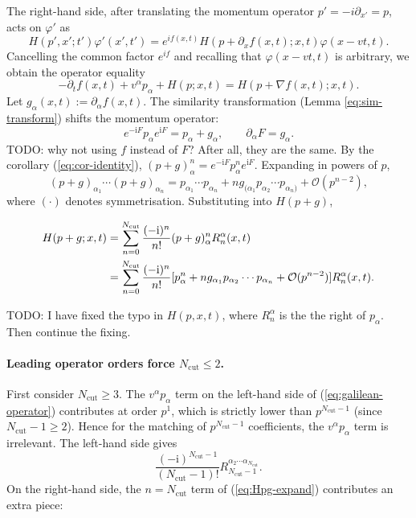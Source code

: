 \documentclass{book}
\newcommand{\assign}{:=}
\newcommand{\cdummy}{\cdot}
\newcommand{\mathi}{\mathrm{i}}
\newcommand{\tmop}[1]{\ensuremath{\operatorname{#1}}}
\begin{document}
The right-hand side, after translating the momentum operator $p' = - i
\partial_{x'} = p$, acts on $\varphi'$ as
\[ H (p', x' ; t') \varphi' (x', t') = e^{if (x, t)} H (p + \partial_x f (x,
   t) ; x, t) \varphi (x - vt, t) . \]
Cancelling the common factor $e^{if}$ and recalling that $\varphi (x - vt, t)$
is arbitrary, we obtain the operator equality
\begin{equation}
  - \partial_t f (x, t) + v^{\alpha} p_{\alpha} + H (p ; x, t) = H (p + \nabla
  f (x, t) ; x, t) . \label{eq:galilean-operator}
\end{equation}
Let $g_{\alpha}  (x, t) \assign \partial_{\alpha} f (x, t)$. The similarity
transformation (Lemma \ref{eq:sim-transform}) shifts the momentum operator:
\[ e^{- \mathi F} p_{\alpha} e^{\mathi F} = p_{\alpha} + g_{\alpha}, \qquad
   \partial_{\alpha} F = g_{\alpha} . \]
   TODO: why not using $f$ instead of $F$? After all, they are the same.
By the corollary (\ref{eq:cor-identity}), $(p + g)_{\alpha}^n = e^{- \mathi F}
p_{\alpha}^n e^{\mathi F}$. Expanding in powers of $p$,
\[ (p + g)_{\alpha_1} \cdots (p + g)_{\alpha_n} = p_{\alpha_1} \cdots
   p_{\alpha_n} + ng_{(\alpha_1} p_{\alpha_2} \cdots p_{\alpha_n)}
   +\mathcal{O} (p^{n - 2}), \]
where $(\cdummy)$ denotes symmetrisation. Substituting into $H (p + g)$,

\begin{align}
  H (p + g ; x, t) & = \sum_{n = 0}^{N_{\tmop{cut}}} \frac{(- \mathi)^n}{n!}
  (p + g)_{\alpha}^n {\color[HTML]{000000}R^{\alpha}_n  (x, t)} \nonumber\\
  & = \sum_{n = 0}^{N_{\tmop{cut}}} \frac{(- \mathi)^n}{n!}
  [p_{\alpha}^n + ng_{\alpha_1}
  p_{\alpha_2} \cdots p_{\alpha_n} +\mathcal{O}(p^{n - 2})] {\color[HTML]{000000}R^{\alpha}_n  (x, t)} . 
  \label{eq:Hpg-expand}
\end{align}

TODO: I have fixed the typo in $H(p,x,t)$, where $R_n^{\alpha}$ is the the right of $p_{\alpha}$. Then continue the fixing.

\paragraph{Leading operator orders force $N_{\tmop{cut}} \le 2$.} First
consider $N_{\tmop{cut}} \ge 3$. The $v^{\alpha} p_{\alpha}$ term on the
left-hand side of (\ref{eq:galilean-operator}) contributes at order $p^1$,
which is strictly lower than $p^{N_{\tmop{cut}} - 1}$ (since $N_{\tmop{cut}} -
1 \ge 2$). Hence for the matching of $p^{N_{\tmop{cut}} - 1}$ coefficients,
the $v^{\alpha} p_{\alpha}$ term is irrelevant. The left-hand side gives
\[ \frac{(- \mathi)^{N_{\tmop{cut}} - 1}}{(N_{\tmop{cut}} - 1) !}
   R_{N_{\tmop{cut}} - 1}^{\alpha_2 \cdots \alpha_{N_{\tmop{cut}}}} . \]
On the right-hand side, the $n = N_{\tmop{cut}}$ term of (\ref{eq:Hpg-expand})
contributes an extra piece:
\end{document}
